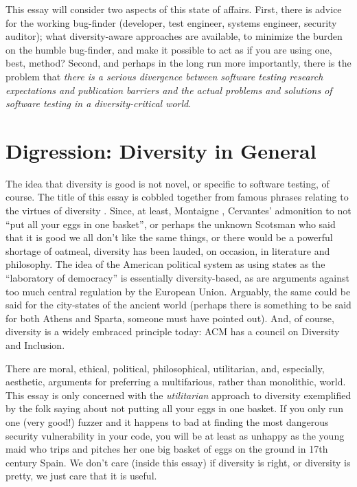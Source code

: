 \documentclass[sigplan,review]{acmart}
\begin{document}
This essay will consider two aspects of this state of affairs.  First,
there is advice for the working bug-finder (developer, test engineer, systems
engineer, security auditor); what diversity-aware approaches are
available, to minimize the burden on the humble bug-finder, and make
it possible to act as if you are using one, best, method?  Second, and
perhaps in the long run 
more importantly, there is the problem that \emph{there is a serious
divergence between software testing research expectations and
publication barriers and the actual problems and solutions of software testing in a
diversity-critical world}.

\section{Digression: Diversity in General}

The idea that diversity is good is not novel, or specific to software
testing, of course.  The title of this essay is cobbled together from
famous phrases relating to the virtues of diversity \cite{chesterton,mao}.  Since, at least,
Montaigne \cite{montaigne}, Cervantes' \cite{cervantes} admonition to not ``put all your eggs in one
basket'', or perhaps the unknown Scotsman who said that it is good we all
don't like the same things, or there would be a powerful shortage of
oatmeal, diversity has been lauded, on occasion, in literature and
philosophy.  The idea of the American political system as using states
as the ``laboratory of democracy'' is essentially diversity-based, as
are arguments against too much central regulation by the European
Union.  Arguably, the same could be said for the city-states of the
ancient world (perhaps there is something to be said for both Athens
and Sparta, someone must have pointed out).  And, of course, diversity
is a widely embraced principle today: ACM has a council on Diversity
and Inclusion.

There are moral, ethical,
political, philosophical, utilitarian, and, especially,
aesthetic, arguments for preferring a multifarious, rather than
monolithic, world.  This essay is only concerned with the \emph{utilitarian}
approach to diversity exemplified by the folk saying about not putting
all your eggs in one basket.  If you only run one (very good!) fuzzer
and it happens to bad at finding the most dangerous security
vulnerability in your code, you will be at least as unhappy as the young maid
who trips and pitches her one big basket of eggs on the ground in 17th
century Spain.  We don't care (inside this essay) if diversity is right, or
diversity is pretty, we just care that it is useful.
\end{document}
